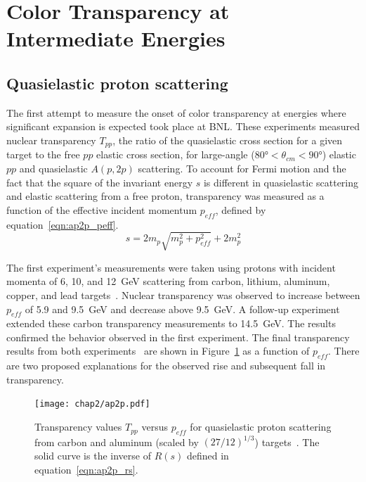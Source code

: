 \section{Color Transparency at Intermediate Energies}
\label{sec:ct_intermediate_energies}

\subsection{Quasielastic proton scattering}
The first attempt to measure the onset of color transparency at energies where
significant expansion is expected took place at BNL.
These experiments measured nuclear transparency $T_{pp}$,
the ratio of the quasielastic cross section for a given target to the free $pp$
elastic cross section, for large-angle
($\ang{80} < \theta_{cm} < \ang{90}$) elastic $pp$ and quasielastic
$A(p,2p)$ scattering.
To account for Fermi motion and the fact that the square of the invariant
energy $s$ is different in quasielastic scattering and elastic scattering
from a free proton, transparency was measured as a function of the effective
incident momentum $p_{eff}$, defined by equation~\ref{eqn:ap2p_peff}.
\begin{equation} \label{eqn:ap2p_peff}
    s = 2 m_p \sqrt{m_p^2 + p_{eff}^2} + 2m_p^2
\end{equation}

The first experiment's measurements were taken using protons with incident
momenta of 6, 10, and \SI{12}{\giga\electronvolt} scattering from carbon,
lithium, aluminum, copper, and lead targets~\cite{Carroll_1988}.
Nuclear transparency was observed to increase between $p_{eff}$ of 5.9 and
\SI{9.5}{\giga\electronvolt} and decrease above \SI{9.5}{\giga\electronvolt}.
A follow-up experiment~\cite{Mardor_1998, Leksanov_2001} extended these
carbon transparency measurements to \SI{14.5}{\giga\electronvolt}.
The results confirmed the behavior observed in the first experiment.
The final transparency results from both experiments~\cite{Aclander_2004} are
shown in Figure~\ref{fig:ap2p} as a function of $p_{eff}$.
There are two proposed explanations for the observed rise and subsequent fall
in transparency.

\begin{figure}[!h]
    \centering
    \texttt{[image: chap2/ap2p.pdf]}
    \caption[Transparency values $T_{pp}$ versus $p_{eff}$ for quasielastic
             proton scattering from carbon and aluminum]{Transparency values $T_{pp}$ versus $p_{eff}$ for quasielastic
             proton scattering from carbon and aluminum (scaled by
             $(27/12)^{1/3}$) targets~\cite{Aclander_2004}.
             The solid curve is the inverse of $R(s)$ defined in
             equation~\ref{eqn:ap2p_rs}.
            }
    \label{fig:ap2p}
\end{figure}

